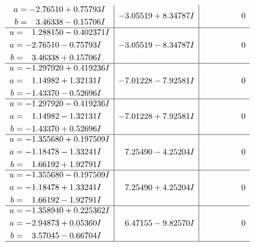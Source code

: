 \documentclass[1p]{elsarticle_modified}
\theoremstyle{definition}
\begin{document}
$$\begin{array}{c|c|c}
\begin{aligned}
a &= -2.76510 + 0.75793 I \\
b &= \phantom{-}3.46338 - 0.15706 I\end{aligned}
 & -3.05519 + 8.34787 I & \phantom{-0.000000 } 0 \\ \hline\begin{aligned}
u &= \phantom{-}1.288150 - 0.402371 I \\
a &= -2.76510 - 0.75793 I \\
b &= \phantom{-}3.46338 + 0.15706 I\end{aligned}
 & -3.05519 - 8.34787 I & \phantom{-0.000000 } 0 \\ \hline\begin{aligned}
u &= -1.297920 + 0.419236 I \\
a &= \phantom{-}1.14982 + 1.32131 I \\
b &= -1.43370 - 0.52696 I\end{aligned}
 & -7.01228 - 7.92581 I & \phantom{-0.000000 } 0 \\ \hline\begin{aligned}
u &= -1.297920 - 0.419236 I \\
a &= \phantom{-}1.14982 - 1.32131 I \\
b &= -1.43370 + 0.52696 I\end{aligned}
 & -7.01228 + 7.92581 I & \phantom{-0.000000 } 0 \\ \hline\begin{aligned}
u &= -1.355680 + 0.197509 I \\
a &= -1.18478 - 1.33241 I \\
b &= \phantom{-}1.66192 + 1.92791 I\end{aligned}
 & \phantom{-}7.25490 - 4.25204 I & \phantom{-0.000000 } 0 \\ \hline\begin{aligned}
u &= -1.355680 - 0.197509 I \\
a &= -1.18478 + 1.33241 I \\
b &= \phantom{-}1.66192 - 1.92791 I\end{aligned}
 & \phantom{-}7.25490 + 4.25204 I & \phantom{-0.000000 } 0 \\ \hline\begin{aligned}
u &= -1.358940 + 0.225362 I \\
a &= -2.94873 + 0.05360 I \\
b &= \phantom{-}3.57045 - 0.66704 I\end{aligned}
 & \phantom{-}6.47155 - 9.82570 I & \phantom{-0.000000 } 0\\
 \hline 
 \end{array}$$\newpage$$\begin{array}{c|c|c}  

\end{array}$$
\end{document}
